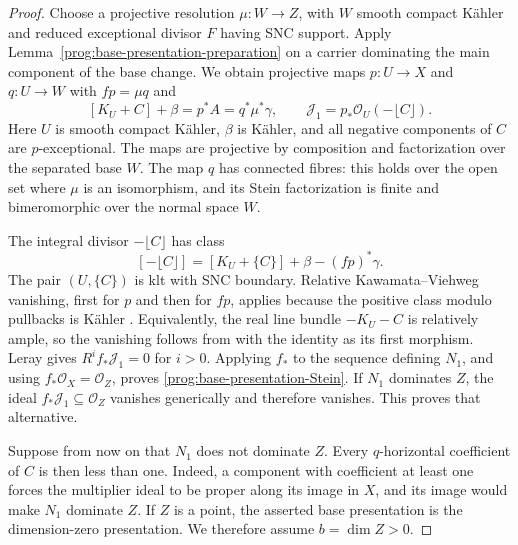 \begin{proof}
Choose a projective resolution $\mu:W\to Z$, with $W$ smooth
compact K\"ahler and reduced exceptional divisor $F$ having SNC
support. Apply Lemma~\ref{prog:base-presentation-preparation} on a
carrier dominating the main component of the base change. We obtain
projective maps $p:U\to X$ and $q:U\to W$ with $fp=\mu q$ and
\begin{equation}\label{prog:base-presentation-source}
 [K_U+C]+\beta=p^*A=q^*\mu^*\gamma,
 \qquad \mathcal J_1=p_*\mathcal O_U(-\lfloor C\rfloor).
\end{equation}
Here $U$ is smooth compact K\"ahler, $\beta$ is K\"ahler, and all
negative components of $C$ are $p$-exceptional. The maps are
projective by composition and factorization over the separated base
$W$. The map $q$ has connected fibres: this holds over the open set
where $\mu$ is an isomorphism, and its Stein factorization is finite
and bimeromorphic over the normal space $W$.

The integral divisor $-\lfloor C\rfloor$ has class
\[
 [-\lfloor C\rfloor]
   =[K_U+\{C\}]+\beta-(fp)^*\gamma.
\]
The pair $(U,\{C\})$ is klt with SNC boundary. Relative
Kawamata--Viehweg vanishing, first for $p$ and then for $fp$, applies
because the positive class modulo pullbacks is K\"ahler
\cite[Theorem~2.2]{HX}. Equivalently, the real line bundle
$-K_U-C$ is relatively ample,
so the vanishing follows from \cite[Theorem~1.2]{FujinoVanishing2025}
with the identity as its first morphism. Leray gives $R^if_*\mathcal J_1=0$ for
$i>0$. Applying $f_*$ to the sequence defining $N_1$, and using
$f_*\mathcal O_X=\mathcal O_Z$, proves
\eqref{prog:base-presentation-Stein}. If $N_1$ dominates $Z$, the
ideal $f_*\mathcal J_1\subseteq\mathcal O_Z$ vanishes generically
and therefore vanishes. This proves that alternative.

Suppose from now on that $N_1$ does not dominate $Z$. Every
$q$-horizontal coefficient of $C$ is then less than one. Indeed,
a component with coefficient at least one forces the multiplier
ideal to be proper along its image in $X$, and its image would make
$N_1$ dominate $Z$. If $Z$ is a point, the asserted base presentation
is the dimension-zero presentation. We therefore assume
$b=\dim Z>0$.


\end{proof}
